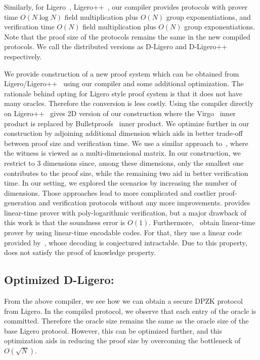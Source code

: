 Similarly, for Ligero~\cite{ligero}, Ligero++~\cite{ligero++}, our compiler provides protocols with  prover time $O(N\log N)$ field multiplication plus $O(N)$ group exponentiations, and verification time $O(N)$ field multiplication plus $O(N)$ group exponentiations. Note that the proof size of the protocols remains the same in the new compiled protocols. We call the distributed versions as D-Ligero and D-Ligero++ respectively.

We provide construction of a new proof system which can be obtained from Ligero/Ligero++~\cite{ligero,ligero++} using our compiler and some additional optimization. The rationale behind opting for Ligero style proof system is that it does not have many oracles. Therefore the conversion is less costly.
Using the compiler directly on Ligero++~\cite{ligero++} gives 2D version of our construction where the Virgo~\cite{Virgo} inner product is replaced by Bulletproofs~\cite{bulletproofs} inner product. We optimize further in our construction by adjoining additional dimension which aids in better trade-off between proof size and verification time. 
We use a similar approach to~\cite{bootle2020linear, bootle2020zero}, where the witness is viewed as a multi-dimensional matrix. In our construction, we restrict to 3 dimensions since, among these dimensions, only the smallest one contributes to the proof size, while the remaining two aid in better verification time. In our setting, we explored the scenarios by increasing the number of dimensions. Those approaches lead to more complicated and costlier proof-generation and verification protocols without any more improvements. \cite{bootle2020zero} provides linear-time prover with poly-logarithmic verification, but a major drawback of this work is that the soundness error is $O(1)$. Furthermore,~\cite{bootle2020linear} obtain linear-time prover by using linear-time encodable codes. For that, they use a linear code provided by~\cite{druk2014linear}, whose decoding is conjectured intractable. Due to this property, ~\cite{bootle2020linear} does not satisfy the proof of knowledge property.

\subsection*{Optimized D-Ligero:}
From the above compiler, we see how we can obtain a secure DPZK protocol from Ligero. In the compiled protocol, we observe that each entry of the oracle is committed. Therefore the oracle size remains the same as the oracle size of the base Ligero protocol. However, this can be optimized further, and this optimization aids in reducing the proof size by overcoming the bottleneck of $O(\sqrt{N})$.

